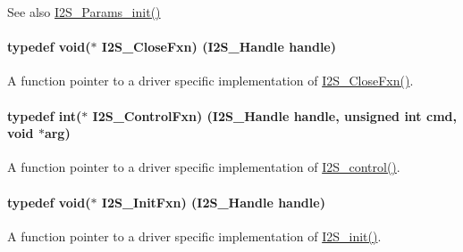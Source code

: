 \begin{DoxySeeAlso}{See also}
\hyperlink{_i2_s_8h_a961c116273a6e8d4581278b2666f13b5}{I2\+S\+\_\+\+Params\+\_\+init()} 
\end{DoxySeeAlso}
\paragraph[{I2\+S\+\_\+\+Close\+Fxn}]{\setlength{\rightskip}{0pt plus 5cm}typedef void($\ast$ I2\+S\+\_\+\+Close\+Fxn) ({\bf I2\+S\+\_\+\+Handle} handle)}\label{_i2_s_8h_a91bfa91197cb8ff2388744088177dde8}


A function pointer to a driver specific implementation of \hyperlink{_i2_s_8h_a91bfa91197cb8ff2388744088177dde8}{I2\+S\+\_\+\+Close\+Fxn()}. 

\paragraph[{I2\+S\+\_\+\+Control\+Fxn}]{\setlength{\rightskip}{0pt plus 5cm}typedef int($\ast$ I2\+S\+\_\+\+Control\+Fxn) ({\bf I2\+S\+\_\+\+Handle} handle, unsigned int cmd, void $\ast$arg)}\label{_i2_s_8h_aec416642887dbc181166c479a79c5615}


A function pointer to a driver specific implementation of \hyperlink{_i2_s_8h_a1af19b22e9036bee696b4e4efe4916b0}{I2\+S\+\_\+control()}. 

\paragraph[{I2\+S\+\_\+\+Init\+Fxn}]{\setlength{\rightskip}{0pt plus 5cm}typedef void($\ast$ I2\+S\+\_\+\+Init\+Fxn) ({\bf I2\+S\+\_\+\+Handle} handle)}\label{_i2_s_8h_a17f21fcbc2627ef97044ee7ff6cfdee6}


A function pointer to a driver specific implementation of \hyperlink{_i2_s_8h_a79e8fdf40ee80c49b2cac09a3e428a82}{I2\+S\+\_\+init()}. 

